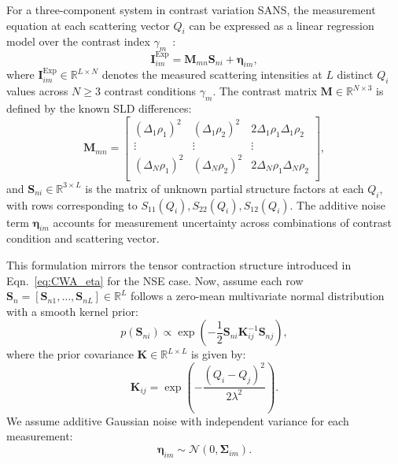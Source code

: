 \documentclass[12pt]{article}
\begin{document}
For a three-component system in contrast variation SANS, the measurement equation at each scattering vector \( Q_i \) can be expressed as a linear regression model over the contrast index \( \gamma_m \)~\cite{Mayumi2025}:
\begin{equation}
    \mathbf{I}^{\mathrm{Exp}}_{im} = \mathbf{M}_{mn} \mathbf{S}_{ni} + \boldsymbol{\eta}_{im},
    \label{eq:CVSANS}
\end{equation}
where \( \mathbf{I}^{\mathrm{Exp}}_{im} \in \mathbb{R}^{L \times N} \) denotes the measured scattering intensities at \( L \) distinct \( Q_i \) values across \( N \geq 3 \) contrast conditions \( \gamma_m \). The contrast matrix \( \mathbf{M} \in \mathbb{R}^{N \times 3} \) is defined by the known SLD differences:
\begin{equation}
\mathbf{M}_{mn} =
\begin{bmatrix}
(\Delta_1 \rho_1)^2 & (\Delta_1 \rho_2)^2 & 2\Delta_1 \rho_1 \Delta_1 \rho_2 \\
\vdots & \vdots & \vdots \\
(\Delta_N \rho_1)^2 & (\Delta_N \rho_2)^2 & 2\Delta_N \rho_1 \Delta_N \rho_2 \\
\end{bmatrix},
\end{equation}
and \( \mathbf{S}_{ni} \in \mathbb{R}^{3 \times L} \) is the matrix of unknown partial structure factors at each \( Q_i \), with rows corresponding to \( S_{11}(Q_i), S_{22}(Q_i), S_{12}(Q_i) \). The additive noise term \( \boldsymbol{\eta}_{im} \) accounts for measurement uncertainty across combinations of contrast condition and scattering vector.

This formulation mirrors the tensor contraction structure introduced in Eqn.~\eqref{eq:CWA_eta} for the NSE case. Now, assume each row \( \mathbf{S}_n = [\mathbf{S}_{n1}, \dots, \mathbf{S}_{nL}] \in \mathbb{R}^L \) follows a zero-mean multivariate normal distribution with a smooth kernel prior:
\begin{equation}
    p(\mathbf{S}_{ni}) \propto \exp\left( -\frac{1}{2} \mathbf{S}_{ni} \mathbf{K}^{-1}_{ij} \mathbf{S}_{nj} \right),
\end{equation}
where the prior covariance \( \mathbf{K} \in \mathbb{R}^{L \times L} \) is given by:
\begin{equation}
    \mathbf{K}_{ij} = \exp\left( -\frac{(Q_i - Q_j)^2}{2\lambda^2} \right).
\end{equation}
We assume additive Gaussian noise with independent variance for each measurement:
\begin{equation}
    \boldsymbol{\eta}_{im} \sim \mathcal{N}(0, \boldsymbol{\Sigma}_{im}).
\end{equation}
\end{document}
